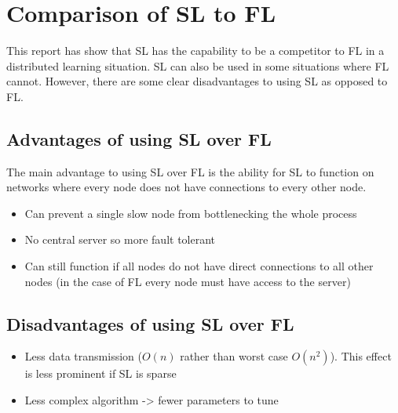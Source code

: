 \section{Comparison of SL to FL}
This report has show that SL has the capability to be a competitor to FL in a distributed learning situation. SL can also be used in some situations where FL cannot. However, there are some clear disadvantages to using SL as opposed to FL.

\subsection{Advantages of using SL over FL}
The main advantage to using SL over FL is the ability for SL to function on networks where every node does not have connections to every other node.


\begin{itemize}
	\item Can prevent a single slow node from bottlenecking the whole process
	\item No central server so more fault tolerant
	\item Can still function if all nodes do not have direct connections to all other nodes (in the case of FL every node must have access to the server)
\end{itemize}


\subsection{Disadvantages of using SL over FL}
\begin{itemize}
	\item Less data transmission ($O(n)$ rather than worst case $O(n^2)$). This effect is less prominent if SL is sparse
	\item Less complex algorithm -> fewer parameters to tune
\end{itemize}
